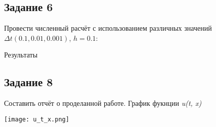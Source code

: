 \documentclass[12pt, a4paper]{report}
\begin{document}
	\subsection*{Задание 6}
	\large

	Провести численный расчёт с использованием различных значений $ \Delta t (0.1, 0.01, 0.001)$, $ h = 0.1 $:

	\begin{table}[h]
	\centering
	\caption{Результаты}
	\label{tab:results}
	\end{table}

	\subsection*{Задание 8}
	\large
	Составить отчёт о проделанной работе. График фукнции \textit{u(t, x)}
	\begin{center}
		\texttt{[image: u\_t\_x.png]}
	\end{center}
\end{document}
